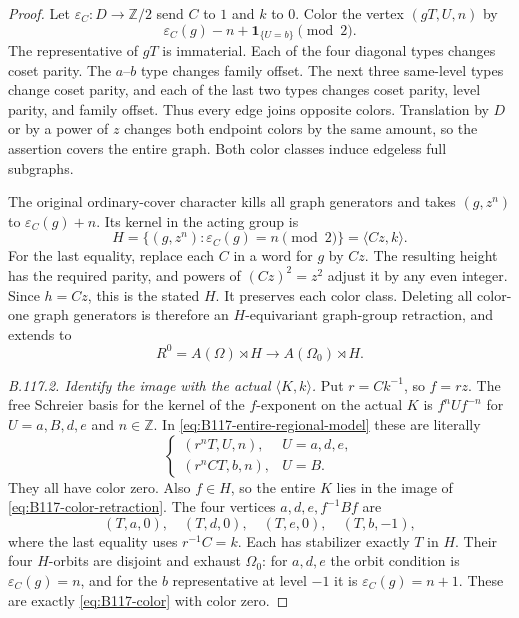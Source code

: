 \begin{proof}
Let $\varepsilon_C:D\to\mathbb Z/2$ send $C$ to $1$ and $k$ to
$0$. Color the vertex $(gT,U,n)$ by
\begin{equation}\label{eq:B117-color}
 \varepsilon_C(g)-n+\mathbf1_{\{U=b\}}\pmod2.
\end{equation}
The representative of $gT$ is immaterial. Each of the four diagonal
types changes coset parity. The $a$--$b$ type changes family offset.
The next three same-level types change coset parity, and each of
the last two types changes coset parity, level parity, and family
offset. Thus every edge joins opposite colors. Translation by $D$
or by a power of $z$ changes both endpoint colors by the same
amount, so the assertion covers the entire graph. Both color classes
induce edgeless full subgraphs.

The original ordinary-cover character kills all graph generators
and takes $(g,z^n)$ to $\varepsilon_C(g)+n$. Its kernel in the
acting group is
\begin{equation}\label{eq:B117-H-kernel}
 H=\{(g,z^n):\varepsilon_C(g)=n\pmod2\}=\langle Cz,k\rangle.
\end{equation}
For the last equality, replace each $C$ in a word for $g$ by $Cz$.
The resulting height has the required parity, and powers of
$(Cz)^2=z^2$ adjust it by any even integer. Since $h=Cz$, this is
the stated $H$. It preserves each color class. Deleting all color-one
graph generators is therefore an $H$-equivariant graph-group
retraction, and extends to
\begin{equation}\label{eq:B117-color-retraction}
 R^0=A(\Omega)\rtimes H
 \longrightarrow A(\Omega_0)\rtimes H.
\end{equation}

\emph{B.117.2. Identify the image with the actual $\langle K,k\rangle$.}
Put $r=Ck^{-1}$, so $f=rz$. The free Schreier basis for the kernel
of the $f$-exponent on the actual $K$ is
$f^n U f^{-n}$ for $U=a,B,d,e$ and $n\in\mathbb Z$.
In \eqref{eq:B117-entire-regional-model} these are literally
\begin{equation}\label{eq:B117-K-vertices}
 \begin{cases}
 (r^nT,U,n),&U=a,d,e,\\
 (r^nCT,b,n),&U=B.
 \end{cases}
\end{equation}
They all have color zero. Also $f\in H$, so the entire $K$ lies
in the image of \eqref{eq:B117-color-retraction}.
The four vertices $a,d,e,f^{-1}Bf$ are
\[
 (T,a,0),\quad(T,d,0),\quad(T,e,0),\quad(T,b,-1),
\]
where the last equality uses $r^{-1}C=k$. Each has stabilizer
exactly $T$ in $H$. Their four $H$-orbits are disjoint and exhaust
$\Omega_0$: for $a,d,e$ the orbit condition is
$\varepsilon_C(g)=n$, and for the $b$ representative at level $-1$
it is $\varepsilon_C(g)=n+1$. These are exactly
\eqref{eq:B117-color} with color zero.


\end{proof}
